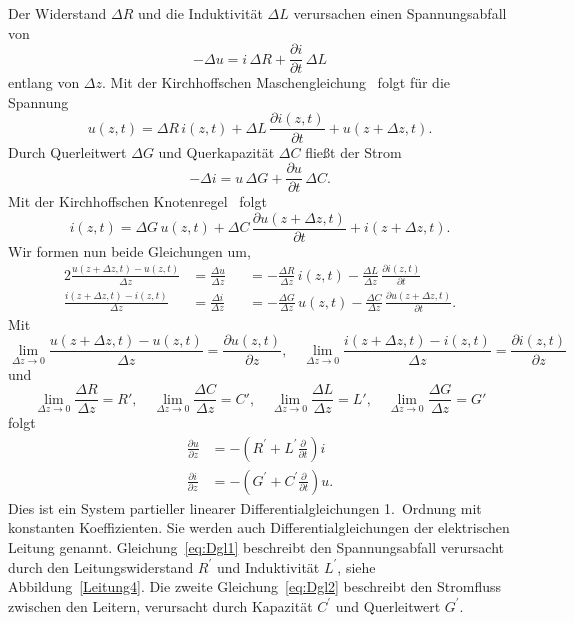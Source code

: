 \documentclass[paper=a4, parskip=half-, ngerman, fontsize=11pt]{scrreprt}
\begin{document}
Der Widerstand $\Delta R$ und die Induktivität $\Delta L$ verursachen einen Spannungsabfall von
\[
- \Delta u = i \, \Delta R + \frac{\partial i}{\partial t} \, \Delta L
\]
entlang von $\Delta z$. Mit der Kirchhoffschen Maschengleichung~\cite{Kirchhoff} folgt für die Spannung
\begin{equation*}
u(z, t) = \Delta R \, i(z, t) + \Delta L \, \frac{\partial i(z, t)}{\partial t} + u(z + \Delta z, t).
\end{equation*}
Durch Querleitwert $\Delta G$ und Querkapazität $\Delta C$ fließt der Strom
\[
- \Delta i = u \, \Delta G + \frac{\partial u}{\partial t} \, \Delta C.
\]
Mit der Kirchhoffschen Knotenregel~\cite{Kirchhoff} folgt
\begin{equation*}
    i(z, t) = \Delta G \, u(z, t) + \Delta C \, \frac{\partial u(z + \Delta z, t)}{\partial t} + i(z + \Delta z, t).
\end{equation*}
Wir formen nun beide Gleichungen um,
\begin{alignat*}{2}
\frac{u(z + \Delta z, t) - u(z, t)}{\Delta z} &= \frac{\Delta u}{\Delta z} &&= - \frac{\Delta R}{\Delta z} \, i(z, t)
- \frac{\Delta L}{\Delta z} \, \frac{\partial i(z, t)}{\partial t} \\[1ex]
\frac{i(z + \Delta z, t) - i(z, t)}{\Delta z} &=   \frac{\Delta i}{\Delta z} &&= - \frac{\Delta G}{\Delta z} \, u(z,
t) - \frac{\Delta C}{\Delta z} \, \frac{\partial u(z + \Delta z, t)}{\partial t}.
\end{alignat*}
Mit
\[
\lim_{\Delta z \to 0} \frac{u(z+\Delta z, t)-u(z, t)}{\Delta z} = \frac{\partial u(z, t)}{\partial z}, \quad
\lim_{\Delta z \to 0} \frac{i(z+\Delta z, t)-i(z, t)}{\Delta z} = \frac{\partial i(z, t)}{\partial z}
\]
und
\[
\lim_{\Delta z \to 0} \frac{\Delta R}{\Delta z} = R', \quad \lim_{\Delta z \to 0} \frac{\Delta C}{\Delta z} = C',
\quad \lim_{\Delta z \to 0} \frac{\Delta L}{\Delta z} = L', \quad \lim_{\Delta z \to 0} \frac{\Delta G}{\Delta z} = G'
\]
folgt
\begin{align}
    \frac{\partial u}{\partial z} &= -\left(R^{\prime} + L^{\prime}\frac{\partial}{\partial t}\right)i \label{eq:Dgl1}
    \\[1ex]
    \frac{\partial i}{\partial z} &= -\left(G^{\prime} + C^{\prime}\frac{\partial}{\partial t}\right)u. \label{eq:Dgl2}
\end{align}
Dies ist ein System partieller linearer Differentialgleichungen 1.~Ordnung mit konstanten Koeffizienten. Sie werden
auch Differentialgleichungen der elektrischen Leitung genannt.
Gleichung~\eqref{eq:Dgl1} beschreibt den Spannungsabfall verursacht durch den Leitungswiderstand $R^{\prime}$ und
Induktivität $L^{\prime}$, siehe Abbildung~\ref{Leitung4}.
Die zweite Gleichung~\eqref{eq:Dgl2} beschreibt den Stromfluss zwischen den Leitern, verursacht durch Kapazität
$C^{\prime}$ und Querleitwert $G^{\prime}$.
\end{document}

